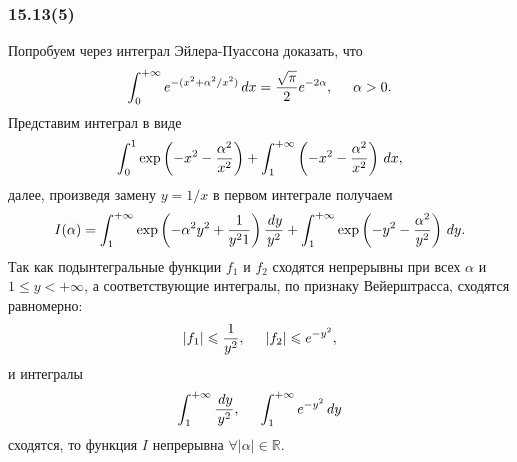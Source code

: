 \subsubsection*{15.13(5)}

Попробуем через интеграл Эйлера-Пуассона доказать, что
\begin{equation*}
    \int_0^{+\infty} e^{-(x^2 + \alpha^2/x^2)} \d x = \frac{\sqrt{\pi}}{2} e^{-2\alpha}, \hspace{5 mm} \alpha > 0.
\end{equation*}
Представим интеграл в виде
\begin{equation*}
    \int_0^1 \exp\left(
        -x^2 - \frac{\alpha^2}{x^2}
    \right) + \int_{1}^{+\infty} \l(
        -x^2 - \frac{\alpha^2}{x^2}
    \r) \d x,
\end{equation*}
далее, произведя замену $y = 1/x$ в первом интеграле получаем
\begin{equation*}
    I(\alpha) = \int_{1}^{+\infty} \exp \l(
        -\alpha^2 y^2 + \frac{1}{y^21}
    \r) \frac{\d y}{y^2} + \int_{1}^{+\infty} \exp\left(
        -y^2 - \frac{\alpha^2}{y^2}
    \right) \d y.
\end{equation*}
Так как подынтегральные функции $f_1$ и $f_2$ сходятся непрерывны при всех $\alpha$ и $1 \leq y < + \infty$, а соответствующие интегралы, по признаку Вейерштрасса, сходятся равномерно:
\begin{equation*}
    |f_1| \leq \frac{1}{y^2}, \hspace{5 mm} |f_2| \leq e^{-y^2},
\end{equation*}
и интегралы
\begin{equation*}
    \int_1^{+\infty} \frac{\d y}{y^2}, \hspace{5 mm} \int_1^{+\infty} e^{-y^2} \d y
\end{equation*}
сходятся, то функция $I$ непрерывна $\forall |\alpha| \in \mathbb{R}$. 


